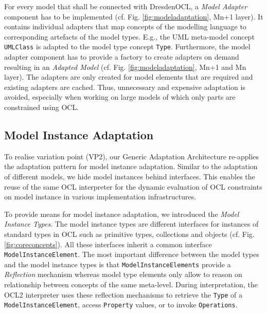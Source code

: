 	For every model that shall be connected with DresdenOCL, 
	a \emph{Model Adapter} component has to be implemented (cf. Fig. \ref{fig:modeladaptation}, Mn+1 layer). 
	It contains individual adapters that map concepts of the modelling
	language to corresponding artefacts of the model types. E.g., the UML
	meta-model concept \texttt{UMLClass} is adapted to the model type concept
	\texttt{Type}. 
	Furthermore, the model adapter component has to provide a factory to create 
	adapters on demand resulting in an \textit{Adapted Model} (cf. Fig.
	\ref{fig:modeladaptation}, Mn+1 and Mn layer).
	The adapters are only created for model elements that are required and
	existing adapters are cached. Thus, unnecessary and expensive adaptation is avoided, 
	especially when working on large models of which only parts are constrained using OCL.


\subsection{Model Instance Adaptation}
	
	To realise variation point (VP2), our Generic Adaptation Architecture
	re-applies the adaptation pattern for model instance adaptation.
	Similar to the adaptation of different models, we hide model
	instances behind
	interfaces. This enables the reuse of the same OCL interpreter for the dynamic
	evaluation of OCL constraints on model instance in various implementation
	infrastructures. 
	
	 To provide means for model instance adaptation, we introduced the
	\emph{Model Instance Types}.  The model instance types are different
	interfaces for instances of standard types in OCL such as primitive types, 
	collections and objects (cf. Fig. \ref{fig:coreconcepts}). 
	All these	interfaces inherit a common interface \texttt{ModelInstanceElement}. The most 
	important difference between the model types and the model instance types
	is that \texttt{ModelInstanceElements} provide a \emph{Reflection} \cite{maesOOPSLA87} mechanism whereas 
	model type elements only allow to reason on relationship between concepts of
	the same meta-level. During interpretation, the OCL2 interpreter uses these reflection mechanisms to
	retrieve the \texttt{Type} of a \texttt{ModelInstanceElement}, access \texttt{Property}
	values, or to invoke \texttt{Operations}.
	
